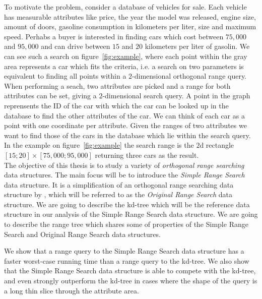 \noindent To motivate the problem, consider a database of vehicles for sale. Each vehicle has measurable attributes like price, the year the model was released, engine size, amount of doors, gasoline consumption in kilometers per liter, size  and maximum speed. Perhabs a buyer is interested in finding cars which cost between $75,000$ and $95,000$ and can drive between $15$ and $20$ kilometers per liter of gasolin. We can see such a search on figure~\ref{fig:example}, where each point within the gray area represents a car which fits the criteria, i.e. a search on two parameters is equivalent to finding all points within a $2$-dimensional orthogonal range query. When performing a seach, two attributes are picked and a range for both attributes can be set, giving a $2$-dimensional search query. A point in the graph reprensents the ID of the car with which the car can be looked up in the database to find the other attributes of the car. We can think of each car as a point with one coordinate per attribute. Given the ranges of two attributes we want to find those of the cars in the database which lie within the search query. In the example on figure~\ref{fig:example} the search range is the $2$d rectangle $[15;20] \times [75,000;95,000]$ returning three cars as the result. \\

The objective of this thesis is to study a variety of \emph{orthogonal range searching} data structures. The main focus will be to introduce the \emph{Simple Range Search} data structure. It is a simplification of an orthogonal range searching data structure by \citet{chanetal}, which will be referred to as the \emph{Original Range Search} data structure. We are going to describe the kd-tree which will be the reference data structure in our analysis of the Simple Range Search data structure. We are going to describe the range tree which shares some of properties of the Simple Range Search and Original Range Search data structures.

We show that a range query to the Simple Range Search data structure has a faster worst-case running time than a range query to the kd-tree. We also show that the Simple Range Search data structure is able to compete with the kd-tree, and even strongly outperform the kd-tree in cases where the shape of the query is a long thin slice through the attribute area.  \\ 



